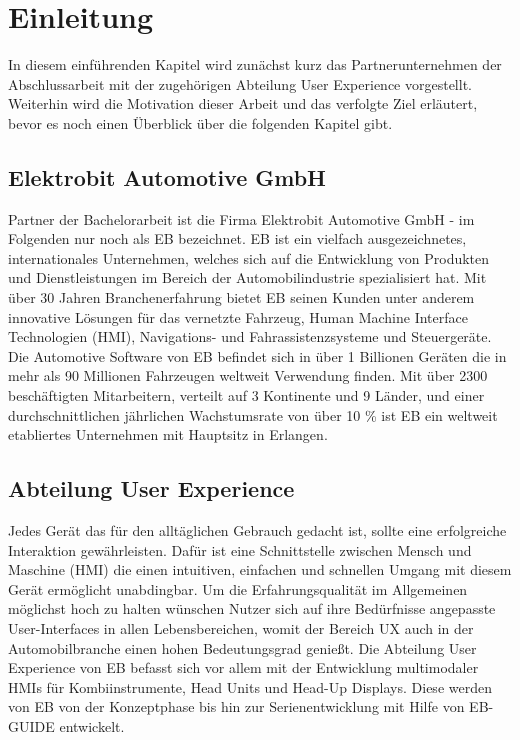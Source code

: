 \chapter{Einleitung}\label{ch:intro}

In diesem einführenden Kapitel wird zunächst kurz das Partnerunternehmen der Abschlussarbeit mit der zugehörigen Abteilung User Experience vorgestellt.
Weiterhin wird die Motivation dieser Arbeit und das verfolgte Ziel erläutert, bevor es noch einen Überblick über die folgenden Kapitel gibt.

\section{Elektrobit Automotive GmbH}
Partner der Bachelorarbeit ist die Firma Elektrobit Automotive GmbH - im Folgenden nur noch als EB bezeichnet.
EB ist ein vielfach ausgezeichnetes, internationales Unternehmen, welches sich auf die Entwicklung von Produkten und Dienstleistungen im Bereich der Automobilindustrie spezialisiert hat.
Mit über 30 Jahren Branchenerfahrung bietet EB seinen Kunden unter anderem innovative Lösungen für das vernetzte Fahrzeug, Human Machine Interface Technologien (HMI), Navigations- und Fahrassistenzsysteme und Steuergeräte. 
Die Automotive Software von EB befindet sich in über 1 Billionen Geräten die in mehr als 90 Millionen Fahrzeugen weltweit Verwendung finden.
Mit über 2300 beschäftigten Mitarbeitern, verteilt auf 3 Kontinente und 9 Länder, und einer durchschnittlichen jährlichen Wachstumsrate von über 10 \% ist EB ein weltweit etabliertes Unternehmen mit Hauptsitz in Erlangen\cite{about_eb}.

\section{Abteilung User Experience}
Jedes Gerät das für den alltäglichen Gebrauch gedacht ist, sollte eine erfolgreiche Interaktion gewährleisten.
Dafür ist eine Schnittstelle zwischen Mensch und Maschine (HMI) die einen intuitiven, einfachen und schnellen Umgang mit diesem Gerät ermöglicht unabdingbar.
Um die Erfahrungsqualität im Allgemeinen möglichst hoch zu halten wünschen Nutzer sich auf ihre Bedürfnisse angepasste User-Interfaces in allen Lebensbereichen, womit der Bereich UX auch in der Automobilbranche einen hohen Bedeutungsgrad genießt.
Die Abteilung User Experience von EB befasst sich vor allem mit der Entwicklung multimodaler HMIs für Kombiinstrumente, Head Units und Head-Up Displays.
Diese werden von EB von der Konzeptphase bis hin zur Serienentwicklung mit Hilfe von EB-GUIDE entwickelt.

